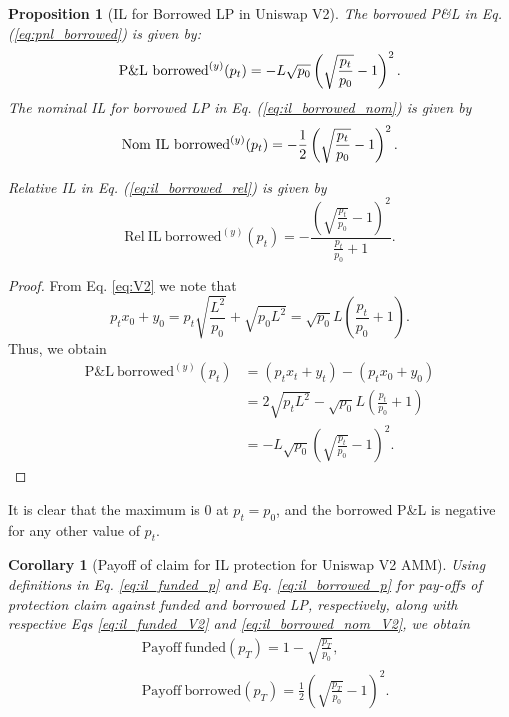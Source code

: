 \documentclass[pdftex,11pt,a4paper] {article}
\newtheorem{corollary}{Corollary}[section]
\newtheorem{proposition}{Proposition}[section]
\begin{document}
\begin{proposition}[IL for Borrowed LP in Uniswap V2]
The borrowed P\&L in Eq. (\ref{eq:pnl_borrowed}) is given by:
\begin{equation}  \label{eq:pnl_borrowed_V2}
\mathrm{P\&L\ borrowed}^{(y)}(p_{t}) = - L \sqrt{p_{0}} \left( \sqrt{\frac{p_{t}}{%
p_{0}}} - 1\right)^{2}.
\end{equation}
The nominal IL for borrowed LP in Eq. (\ref{eq:il_borrowed_nom}) is given by
\begin{equation}  \label{eq:il_borrowed_nom_V2}
\mathrm{Nom \ IL \ borrowed}^{(y)}(p_{t}) = - \frac{1}{2} \left( \sqrt{\frac{p_{t}}{%
p_{0}}} - 1\right)^{2}.
\end{equation}

Relative IL in Eq. (\ref{eq:il_borrowed_rel}) is given by
\begin{equation}  \label{eq:il_borrowed_rel_V2}
\mathrm{Rel \ IL \ borrowed}^{(y)}(p_{t}) = - \frac{ \left( \sqrt{\frac{p_{t}}{p_{0}}}
- 1\right)^{2}}{ \frac{p_{t}}{p_{0}} +1}.
\end{equation}
\end{proposition}

\begin{proof}
From Eq. \eqref{eq:V2} we note that
\begin{equation} \label{eq:v4a}
p_{t} x_{0} + y_{0}= p_{t} \sqrt{\frac{L^{2}}{p_{0}}}+ \sqrt{p_{0} L^{2}} = \sqrt{p_{0}} L\left( \frac{p_{t}}{p_{0}} +1 \right).
\end{equation}
Thus, we obtain
\begin{equation} \label{eq:v4}
\begin{split}
\mathrm{P\&L \ borrowed}^{(y)}(p_{t}) &  = \left(p_{t} x_{t} + y_{t}\right)  - \left(p_{t} x_{0} + y_{0}\right)\\
& = 2\sqrt{p_{t} L^{2}} - \sqrt{p_{0}} L\left( \frac{p_{t}}{p_{0}} +1 \right)\\
& = - L \sqrt{p_{0}}  \left( \sqrt{\frac{p_{t}}{p_{0}}} - 1\right)^{2}.
\end{split}
\end{equation}

\end{proof}

It is clear that the maximum is $0$ at $p_{t}=p_{0}$, and the
borrowed P\&L is negative for any other value of $p_{t}$.

\begin{corollary}[Payoff of claim for IL protection for Uniswap V2 AMM]
Using definitions in Eq. \eqref{eq:il_funded_p} and Eq. %
\eqref{eq:il_borrowed_p} for pay-offs of protection claim against funded and
borrowed LP, respectively, along with respective Eqs \eqref{eq:il_funded_V2}
and \eqref{eq:il_borrowed_nom_V2}, we obtain
\begin{equation}  \label{eq:il_payoff_v2}
\begin{split}
& \mathrm{Payoff \ funded}(p_{T}) = 1 - \sqrt{\frac{p_{T}}{p_{0}}} , \\
& \mathrm{Payoff \ borrowed}(p_{T}) = \frac{1}{2} \left( \sqrt{\frac{p_{T}}{p_{0}}} -
1\right)^{2}.
\end{split}%
\end{equation}
\end{corollary}
\end{document}

